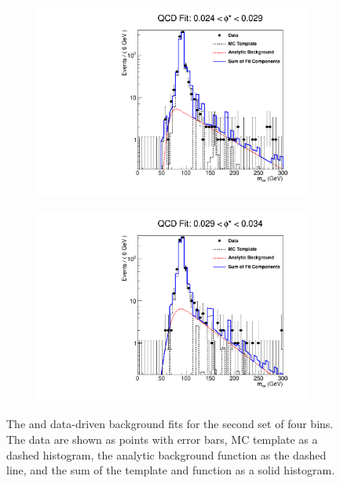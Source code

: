 \begin{figure}[!htbp]
\begin{subfigure}[b]{\SideBySidePlotWidth}
        \includegraphics[width=\linewidth]{figures/qcd_fits/qcd_fit_plot_for_07.pdf}
        \label{fig:qcd_fit_07}
    \end{subfigure}%
    \begin{subfigure}[b]{\SideBySidePlotWidth}
        \includegraphics[width=\linewidth]{figures/qcd_fits/qcd_fit_plot_for_08.pdf}
        \label{fig:qcd_fit_08}
    \end{subfigure}
    \caption[
        The \QCDjets and \wjets data-driven background fits for the second set
        of four \phistar bins.
    ]{
        The \QCDjets and \wjets data-driven background fits for the second set
        of four \phistar bins. The data are shown as points with error bars, MC
        template as a dashed histogram, the analytic background function as the
        dashed line, and the sum of the template and function as a solid
        histogram.
    }
    \label{fig:qcd_many_2}
\end{figure}


